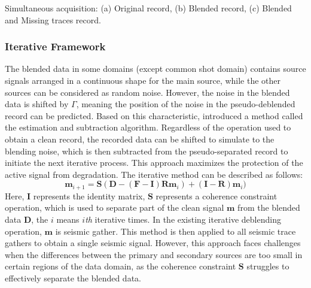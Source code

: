\documentclass{segabs}
\begin{document}
{Simultaneous acquisition: (a) Original record, (b) Blended record, (c) Blended and Missing traces record.}
\subsubsection{Iterative Framework}

The blended data in some domains (except common shot domain) contains source signals arranged in a continuous shape for the main source, while the other sources can be considered as random noise. However, the noise in the blended data is shifted by $\Gamma$, meaning the position of the noise in the pseudo-deblended record can be predicted. Based on this characteristic, \cite{mahdad2011} introduced a method called the estimation and subtraction algorithm. Regardless of the operation used to obtain a clean record, the recorded data can be shifted to simulate to the blending noise, which is then subtracted from the pseudo-separated record to initiate the next iterative process. This approach maximizes the protection of the active signal from degradation. The iterative method can be described as follows:
\begin{equation}
\mathbf{m}_{i+1} = \mathbf{S}(\mathbf{D}-(\mathbf{F}-\mathbf{I})\mathbf{R} \mathbf{m}_i)+(\mathbf{I}-\mathbf{R})\mathbf{m}_i)
\end{equation}
Here, $\mathbf{I}$ represents the identity matrix, $\mathbf{S}$ represents a coherence constraint operation, which is used to separate part of the clean signal $\mathbf{m}$ from the blended data $\mathbf{D}$, the $i$ means $i$\textit{th} iterative times. In the existing iterative deblending operation, $\mathbf{m}$ is seismic gather. This method is then applied to all seismic trace gathers to obtain a single seismic signal. However, this approach faces challenges when the differences between the primary and secondary sources are too small in certain regions of the data domain, as the coherence constraint $\mathbf{S}$ struggles to effectively separate the blended data. 
\end{document}
